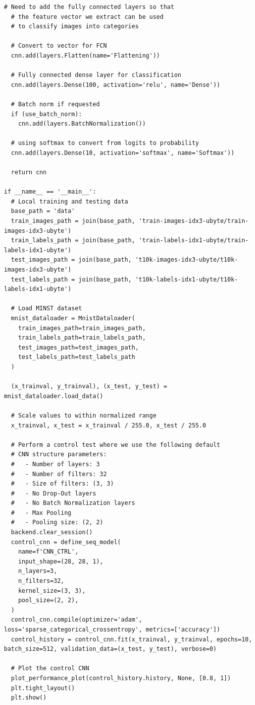 \documentclass[a4paper]{article}
\begin{document}
\begin{lstlisting}[basicstyle= \scriptsize]
  # Need to add the fully connected layers so that 
  # the feature vector we extract can be used 
  # to classify images into categories

  # Convert to vector for FCN
  cnn.add(layers.Flatten(name='Flattening'))                      

  # Fully connected dense layer for classification
  cnn.add(layers.Dense(100, activation='relu', name='Dense'))     

  # Batch norm if requested 
  if (use_batch_norm):
    cnn.add(layers.BatchNormalization())

  # using softmax to convert from logits to probability
  cnn.add(layers.Dense(10, activation='softmax', name='Softmax')) 

  return cnn

if __name__ == '__main__':
  # Local training and testing data
  base_path = 'data'
  train_images_path = join(base_path, 'train-images-idx3-ubyte/train-images-idx3-ubyte')
  train_labels_path = join(base_path, 'train-labels-idx1-ubyte/train-labels-idx1-ubyte')
  test_images_path = join(base_path, 't10k-images-idx3-ubyte/t10k-images-idx3-ubyte')
  test_labels_path = join(base_path, 't10k-labels-idx1-ubyte/t10k-labels-idx1-ubyte')

  # Load MINST dataset
  mnist_dataloader = MnistDataloader(
    train_images_path=train_images_path, 
    train_labels_path=train_labels_path, 
    test_images_path=test_images_path, 
    test_labels_path=test_labels_path
  )

  (x_trainval, y_trainval), (x_test, y_test) = mnist_dataloader.load_data()

  # Scale values to within normalized range
  x_trainval, x_test = x_trainval / 255.0, x_test / 255.0

  # Perform a control test where we use the following default
  # CNN structure parameters:
  #   - Number of layers: 3
  #   - Number of filters: 32
  #   - Size of filters: (3, 3)
  #   - No Drop-Out layers
  #   - No Batch Normalization layers
  #   - Max Pooling
  #   - Pooling size: (2, 2)
  backend.clear_session()
  control_cnn = define_seq_model(
    name=f'CNN_CTRL',
    input_shape=(28, 28, 1),
    n_layers=3,
    n_filters=32,
    kernel_size=(3, 3),
    pool_size=(2, 2),
  )
  control_cnn.compile(optimizer='adam', loss='sparse_categorical_crossentropy', metrics=['accuracy'])
  control_history = control_cnn.fit(x_trainval, y_trainval, epochs=10, batch_size=512, validation_data=(x_test, y_test), verbose=0)

  # Plot the control CNN
  plot_performance_plot(control_history.history, None, [0.8, 1])
  plt.tight_layout()
  plt.show()


\end{lstlisting}
\end{document}
